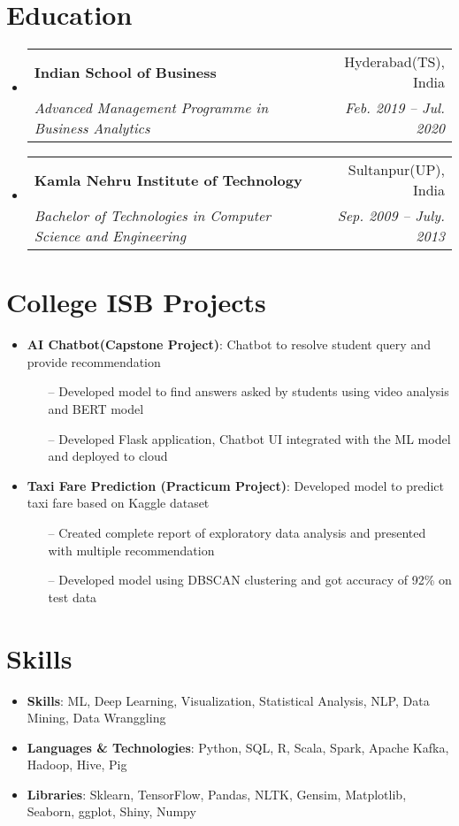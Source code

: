 \documentclass[letterpaper,11pt]{article}
\makeatletter
\newcommand{\resumeItem}[2]{
  \item\small{
    \textbf{#1}{: #2 \vspace{-2pt}}
  }
}
\newcommand{\resumeSubheading}[4]{
  \vspace{-1pt}\item
    \begin{tabular*}{0.97\textwidth}[t]{l@{\extracolsep{\fill}}r}
      \textbf{#1} & #2 \\
      \textit{\small#3} & \textit{\small #4} \\
    \end{tabular*}\vspace{-5pt}
}
\newcommand{\resumeSubItem}[2]{\resumeItem{#1}{#2}\vspace{-4pt}}
\newcommand{\resumeSubHeadingListStart}{\begin{itemize}[leftmargin=*]}
\newcommand{\resumeSubHeadingListEnd}{\end{itemize}}
\makeatother
\begin{document}
\section{Education}
  \resumeSubHeadingListStart
    \resumeSubheading
      {Indian School of Business}{Hyderabad(TS), India}
      {Advanced Management Programme in Business Analytics}{Feb. 2019 -- Jul. 2020}
    \resumeSubheading
      {Kamla Nehru Institute of Technology}{Sultanpur(UP), India}
      {Bachelor of Technologies in Computer Science and Engineering}{Sep. 2009 -- July. 2013}
  \resumeSubHeadingListEnd

\section{College ISB Projects}
  \resumeSubHeadingListStart
    \resumeSubItem{AI Chatbot(Capstone Project)}
      {Chatbot to resolve student query and provide recommendation}
        \begin{itemize}
            \item[--] Developed model to find answers asked by students using video analysis and BERT model
            \item[--] Developed Flask application, Chatbot UI integrated with the ML model and deployed to cloud
        \end{itemize}
    \resumeSubItem{Taxi Fare Prediction (Practicum Project)}
      {Developed model to predict taxi fare based on Kaggle dataset}
        \begin{itemize}
            \item[--] Created complete report of exploratory data analysis and presented with multiple recommendation
            \item[--] Developed model using DBSCAN clustering and got accuracy of 92\% on test data
        \end{itemize}
  \resumeSubHeadingListEnd

\section{Skills}
 \resumeSubHeadingListStart
   \item{
     \textbf{Skills}{: ML, Deep Learning, Visualization, Statistical Analysis, NLP, Data Mining, Data Wranggling}
   }
   \item {
     \textbf{Languages \& Technologies}{: Python, SQL, R, Scala, Spark, Apache Kafka, Hadoop, Hive, Pig}
   }
   \item {
     \textbf{Libraries}{: Sklearn, TensorFlow, Pandas, NLTK, Gensim, Matplotlib, Seaborn, ggplot, Shiny, Numpy}
   }
 \resumeSubHeadingListEnd


\end{document}
